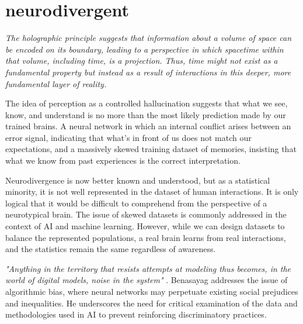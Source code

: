 \chapter*{neurodivergent}
\begin{center}
\vspace{2cm}
\begin{flushright}
\large
\textit{The holographic principle suggests that information about a volume of space can be encoded on its boundary, leading to a perspective in which spacetime within that volume, including time, is a projection. Thus, time might not exist as a fundamental property but instead as a result of interactions in this deeper, more fundamental layer of reality.}
\end{flushright}
\vspace{2cm}
\end{center}
\normalsize

\newpage  %
The idea of perception as a controlled hallucination suggests that what we see, know, and understand is no more than the most likely prediction made by our trained brains. A neural network in which an internal conflict arises between an error signal, indicating that what's in front of us does not match our expectations, and a massively skewed training dataset of memories, insisting that what we know from past experiences is the correct interpretation.

Neurodivergence is now better known and understood, but as a statistical minority, it is not well represented in the dataset of human interactions. It is only logical that it would be difficult to comprehend from the perspective of a neurotypical brain. The issue of skewed datasets is commonly addressed in the context of AI and machine learning. However, while we can design datasets to balance the represented populations, a real brain learns from real interactions, and the statistics remain the same regardless of awareness.

\textit{"Anything in the territory that resists attempts at modeling thus becomes, in the world of digital models, noise in the system"} \citep{benasayag2019}. Benasayag addresses the issue of algorithmic bias, where neural networks may perpetuate existing social prejudices and inequalities. He underscores the need for critical examination of the data and methodologies used in AI to prevent reinforcing discriminatory practices.

